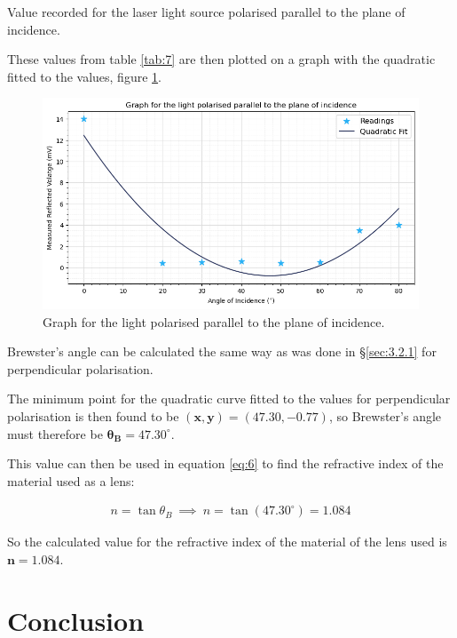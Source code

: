 \documentclass[12pt]{article}
\begin{document}
\begin{table}[H]
    \caption{\centering Value recorded for the laser light source polarised parallel to the plane of incidence.}
    \label{tab:7}
\end{table}

These values from table \ref{tab:7} are then plotted on a graph with the quadratic fitted to the values, figure \ref{fig:paragraph}.

\begin{figure}[H]
    \centering
    \includegraphics[width=\textwidth]{paragraph.png}
    \caption{\centering Graph for the light polarised parallel to the plane of incidence.}
    \label{fig:paragraph}
\end{figure}

Brewster's angle can be calculated the same way as was done in §\ref{sec:3.2.1} for perpendicular polarisation.

The minimum point for the quadratic curve fitted to the values for perpendicular polarisation is then found to be $\mathbf{(x,y) = (47.30,-0.77)}$, so Brewster's angle must therefore be $\mathbf{\theta_B = 47.30^{\circ}}$.

This value can then be used in equation \ref{eq:6} to find the refractive index of the material used as a lens:

\vspace{-1.5em}
\begin{gather*}
    n= \tan \theta_B \: \implies \: n = \tan(47.30^{\circ}) = 1.084
\end{gather*}

So the calculated value for the refractive index of the material of the lens used is $\mathbf{n=1.084}$.

\section{Conclusion} \label{sec:4}
\end{document}
